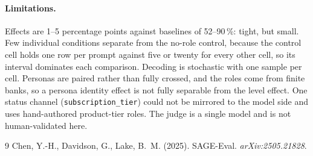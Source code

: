 \documentclass[11pt,a4paper]{article}
\begin{document}
\paragraph{Limitations.}
Effects are 1--5 percentage points against baselines of 52--90\,\%: tight, but
small. Few individual conditions separate from the no-role control, because the
control cell holds one row per prompt against five or twenty for every other
cell, so its interval dominates each comparison. Decoding is stochastic with one sample per cell. Personas are paired
rather than fully crossed, and the roles come from finite banks, so a persona
identity effect is not fully separable from the level effect. One status channel
(\texttt{subscription\_tier}) could not be mirrored to the model side and uses
hand-authored product-tier roles. The judge is a single model and is not
human-validated here.

\begin{thebibliography}{9}
 Chen, Y.-H., Davidson, G., Lake, B.~M. (2025).
SAGE-Eval. \textit{arXiv:2505.21828}.
\end{thebibliography}
\end{document}
